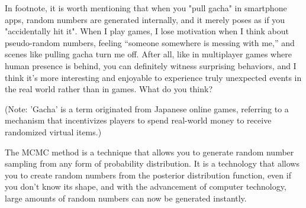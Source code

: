 \documentclass{ltjsarticle}
\begin{document}
In footnote, it is worth mentioning that when you "pull gacha" in smartphone apps, random numbers are generated internally, and it merely poses as if you "accidentally hit it". When I play games, I lose motivation when I think about pseudo-random numbers, feeling “someone somewhere is messing with me,” and scenes like pulling gacha turn me off. After all, like in multiplayer games where human presence is behind, you can definitely witness surprising behaviors, and I think it’s more interesting and enjoyable to experience truly unexpected events in the real world rather than in games. What do you think?

(Note: 'Gacha' is a term originated from Japanese online games, referring to a mechanism that incentivizes players to spend real-world money to receive randomized virtual items.)

The MCMC method is a technique that allows you to generate random number sampling from any form of probability distribution. It is a technology that allows you to create random numbers from the posterior distribution function, even if you don't know its shape, and with the advancement of computer technology, large amounts of random numbers can now be generated instantly.
\end{document}
